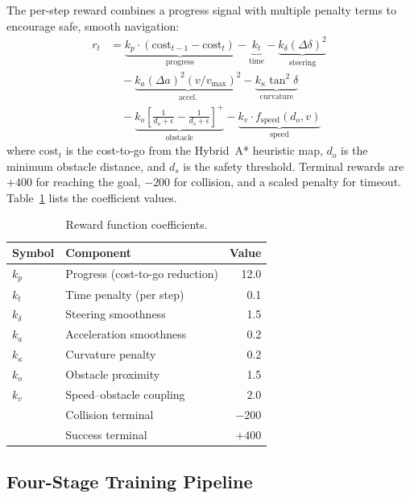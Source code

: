 \documentclass[conference]{IEEEtran}
\begin{document}
The per-step reward combines a progress signal with multiple penalty terms to encourage safe, smooth navigation:
\begin{align}
    r_t &= \underbrace{k_p \cdot (\text{cost}_{t-1} - \text{cost}_t)}_{\text{progress}} - \underbrace{k_t}_{\text{time}} - \underbrace{k_\delta (\Delta\delta)^2}_{\text{steering}} \nonumber \\
    &\quad - \underbrace{k_a (\Delta a)^2 (v/v_{\max})^2}_{\text{accel.}} - \underbrace{k_\kappa \tan^2\delta}_{\text{curvature}} \nonumber \\
    &\quad - \underbrace{k_o \left[\frac{1}{d_o+\epsilon} - \frac{1}{d_s+\epsilon}\right]^+}_{\text{obstacle}} - \underbrace{k_v \cdot f_{\text{speed}}(d_o, v)}_{\text{speed}} \label{eq:reward}
\end{align}
where $\text{cost}_t$ is the cost-to-go from the Hybrid~A* heuristic map, $d_o$ is the minimum obstacle distance, and $d_s$ is the safety threshold.
Terminal rewards are $+400$ for reaching the goal, $-200$ for collision, and a scaled penalty for timeout.
Table~\ref{tab:reward_coeff} lists the coefficient values.

\begin{table}[t]
\centering
\caption{Reward function coefficients.}
\label{tab:reward_coeff}
\footnotesize
\begin{tabular}{@{}llr@{}}
\toprule
\textbf{Symbol} & \textbf{Component} & \textbf{Value} \\
\midrule
$k_p$ & Progress (cost-to-go reduction)     & 12.0 \\
$k_t$ & Time penalty (per step)             & 0.1 \\
$k_\delta$ & Steering smoothness            & 1.5 \\
$k_a$ & Acceleration smoothness             & 0.2 \\
$k_\kappa$ & Curvature penalty              & 0.2 \\
$k_o$ & Obstacle proximity                  & 1.5 \\
$k_v$ & Speed--obstacle coupling            & 2.0 \\
\midrule
& Collision terminal                        & $-200$ \\
& Success terminal                          & $+400$ \\
\bottomrule
\end{tabular}
\end{table}

\subsection{Four-Stage Training Pipeline}\label{sec:pipeline}
\end{document}
